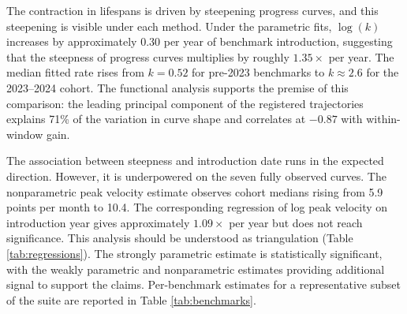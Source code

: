 The contraction in lifespans is driven by steepening progress curves, and this steepening is visible under each method. Under the parametric fits, $\log(k)$ increases by approximately 0.30 per year of benchmark introduction, suggesting that the steepness of progress curves multiplies by roughly $1.35\times$ per year. The median fitted rate rises from $k = 0.52$ for pre-2023 benchmarks to $k \approx 2.6$ for the 2023--2024 cohort. The functional analysis supports the premise of this comparison: the leading principal component of the registered trajectories explains 71\% of the variation in curve shape and correlates at $-0.87$ with within-window gain.

The association between steepness and introduction date runs in the expected direction. However, it is underpowered on the seven fully observed curves. The nonparametric peak velocity estimate observes cohort medians rising from 5.9 points per month to 10.4. The corresponding regression of log peak velocity on introduction year gives approximately $1.09\times$ per year but does not reach significance. This analysis should be understood as triangulation (Table \ref{tab:regressions}). The strongly parametric estimate is statistically significant, with the weakly parametric and nonparametric estimates providing additional signal to support the claims. Per-benchmark estimates for a representative subset of the suite are reported in Table \ref{tab:benchmarks}.

\begin{table}[t]
\centering
\caption{Regression estimates of the change in saturation speed. Each row regresses the stated outcome on the benchmark's introduction date; rows are ordered from strongest to weakest structural assumptions.}
\label{tab:regressions}
\end{table}

